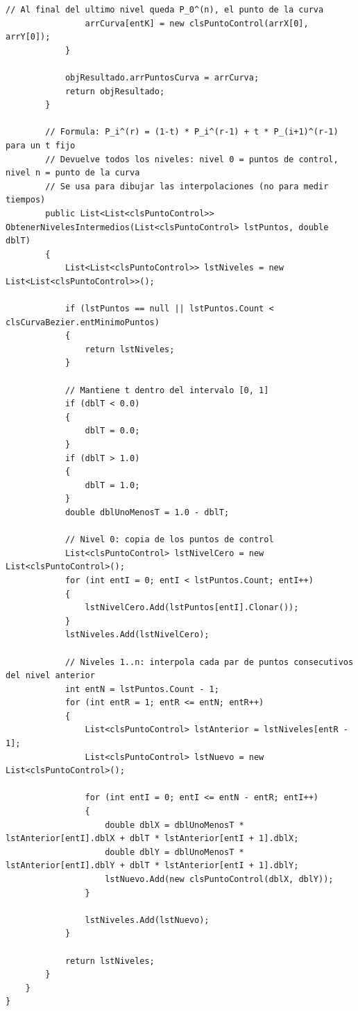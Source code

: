 \begin{lstlisting}[language={[Sharp]C}, caption={Clase clsEvaluadorDeCasteljau (algoritmo de De Casteljau).}, label={lst:anx_casteljau}]
                // Al final del ultimo nivel queda P_0^(n), el punto de la curva
                arrCurva[entK] = new clsPuntoControl(arrX[0], arrY[0]);
            }

            objResultado.arrPuntosCurva = arrCurva;
            return objResultado;
        }

        // Formula: P_i^(r) = (1-t) * P_i^(r-1) + t * P_(i+1)^(r-1) para un t fijo
        // Devuelve todos los niveles: nivel 0 = puntos de control, nivel n = punto de la curva
        // Se usa para dibujar las interpolaciones (no para medir tiempos)
        public List<List<clsPuntoControl>> ObtenerNivelesIntermedios(List<clsPuntoControl> lstPuntos, double dblT)
        {
            List<List<clsPuntoControl>> lstNiveles = new List<List<clsPuntoControl>>();

            if (lstPuntos == null || lstPuntos.Count < clsCurvaBezier.entMinimoPuntos)
            {
                return lstNiveles;
            }

            // Mantiene t dentro del intervalo [0, 1]
            if (dblT < 0.0)
            {
                dblT = 0.0;
            }
            if (dblT > 1.0)
            {
                dblT = 1.0;
            }
            double dblUnoMenosT = 1.0 - dblT;

            // Nivel 0: copia de los puntos de control
            List<clsPuntoControl> lstNivelCero = new List<clsPuntoControl>();
            for (int entI = 0; entI < lstPuntos.Count; entI++)
            {
                lstNivelCero.Add(lstPuntos[entI].Clonar());
            }
            lstNiveles.Add(lstNivelCero);

            // Niveles 1..n: interpola cada par de puntos consecutivos del nivel anterior
            int entN = lstPuntos.Count - 1;
            for (int entR = 1; entR <= entN; entR++)
            {
                List<clsPuntoControl> lstAnterior = lstNiveles[entR - 1];
                List<clsPuntoControl> lstNuevo = new List<clsPuntoControl>();

                for (int entI = 0; entI <= entN - entR; entI++)
                {
                    double dblX = dblUnoMenosT * lstAnterior[entI].dblX + dblT * lstAnterior[entI + 1].dblX;
                    double dblY = dblUnoMenosT * lstAnterior[entI].dblY + dblT * lstAnterior[entI + 1].dblY;
                    lstNuevo.Add(new clsPuntoControl(dblX, dblY));
                }

                lstNiveles.Add(lstNuevo);
            }

            return lstNiveles;
        }
    }
}
\end{lstlisting}

